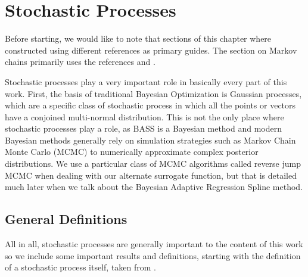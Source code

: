 \chapter{Stochastic Processes}

Before starting, we would like to note that sections of this chapter where constructed using different references as primary guides. The section on Markov chains primarily uses the references \cite{Zitkovic_2010} and \cite{hohendorff_introduction_2005}. 

Stochastic processes play a very important role in basically every part of this work. First, the basis of traditional Bayesian Optimization is Gaussian processes, which are a specific class of stochastic process in which all the points or vectors have a conjoined multi-normal distribution. This is not the only place where stochastic processes play a role, as BASS is a Bayesian method and modern Bayesian methods generally rely on simulation strategies such as Markov Chain Monte Carlo (MCMC) to numerically approximate complex posterior distributions. We use a particular class of MCMC algorithms called reverse jump MCMC when dealing with our alternate surrogate function, but that is detailed much later when we talk about the Bayesian Adaptive Regression Spline method. 


\section{General Definitions}

All in all, stochastic processes are generally important to the content of this work so we include some important results and definitions, starting with the definition of a stochastic process itself, taken from \cite{Zitkovic_2010}. 

